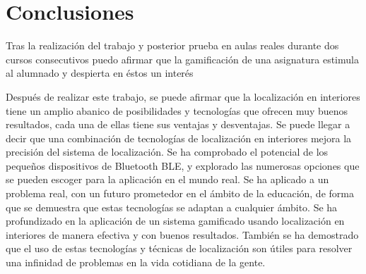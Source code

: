 \setcounter{chapter}{9}
\setcounter{section}{0}
\setcounter{subsection}{0}
\chapter{Conclusiones}

Tras la realización del trabajo y posterior prueba en aulas reales durante dos cursos consecutivos puedo afirmar que la gamificación de una asignatura estimula al alumnado y despierta en éstos un interés 







Después de realizar este trabajo, se puede afirmar que la localización en
interiores tiene un amplio abanico de posibilidades y tecnologías que ofrecen
muy buenos resultados, cada una de ellas tiene sus ventajas y desventajas. Se
puede llegar a decir que una combinación de tecnologías de localización en
interiores mejora la precisión del sistema de localización.
Se ha comprobado el potencial de los pequeños dispositivos de Bluetooth
BLE, y explorado las numerosas opciones que se pueden escoger para la
aplicación en el mundo real.
Se ha aplicado a un problema real, con un futuro prometedor en el ámbito
de la educación, de forma que se demuestra que estas tecnologías se adaptan
a cualquier ámbito.
Se ha profundizado en la aplicación de un sistema gamificado usando
localización en interiores de manera efectiva y con buenos resultados.
También se ha demostrado que el uso de estas tecnologías y técnicas de
localización son útiles para resolver una infinidad de problemas en la vida
cotidiana de la gente.
